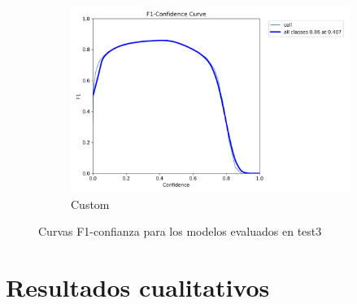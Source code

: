 \documentclass[12pt,a4paper,onecolumn,oneside]{report}
\begin{document}
\begin{figure}[H]
  \vspace{0.5cm}
  \begin{subfigure}[b]{0.48\textwidth}
    \centering
    \includegraphics[width=\textwidth]{figuras/resultados experimentacion/custom/test3/BoxF1_curve.png}
    \caption{Custom}
    \label{fig:custom_test3}
  \end{subfigure}
  
  \caption{Curvas F1-confianza para los modelos evaluados en test3}
  \label{fig:f1_curves_test3}
\end{figure}

\section{Resultados cualitativos}
\label{sec:Resultados cualitativos anexo}
\end{document}
